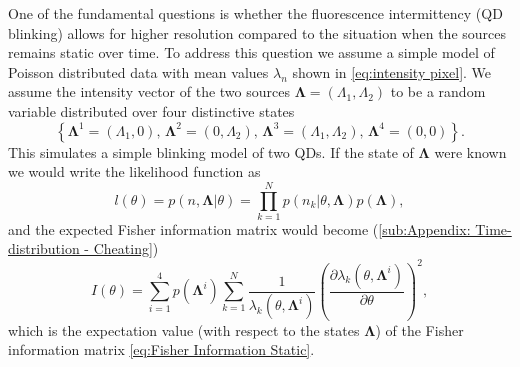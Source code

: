 One of the fundamental questions is whether the fluorescence intermittency (QD blinking) allows for higher resolution compared to the situation when the sources remains static over time. To address this question we assume a simple model of Poisson distributed data with mean values $\lambda_n$ shown in \autoref{eq:intensity pixel}. We assume the intensity vector of the two sources $\bm{\Lambda}=(\Lambda_1,\Lambda_2)$ to be a random variable distributed over four distinctive states
%
\begin{equation}
	\left\{ \bm{\Lambda}^1=(\Lambda_1,0),\,\bm{\Lambda}^2=(0,\Lambda_2),\,\bm{\Lambda}^3=(\Lambda_1,\Lambda_2),\,\bm{\Lambda}^4=(0,0)\right\} .
\end{equation}
%
This simulates a simple blinking model of two QDs. If the state of $\bm{\Lambda}$ were known we would write the likelihood function as 
%
\begin{equation}
	l(\theta)=p(n,\bm{\Lambda}|\theta)=\prod_{k=1}^Np(n_k|\theta,\bm{\Lambda})p(\bm{\Lambda}),
\end{equation}
%
and the expected Fisher information matrix would become (\autoref{sub:Appendix: Time-distribution - Cheating})
%
\begin{equation}
	I(\theta)=\sum_{i=1}^4p(\bm{\Lambda}^i)\sum_{k=1}^N\frac{1}{\lambda_k(\theta,\bm{\Lambda}^i)}\left(\frac{\partial\lambda_k(\theta,\bm{\Lambda}^i)}{\partial\theta}\right)^2,\label{eq:Fisher Information Blinking Cheating}
\end{equation}
%
which is the expectation value (with respect to the states $\bm{\Lambda}$) of the Fisher information matrix \autoref{eq:Fisher Information Static}. 

